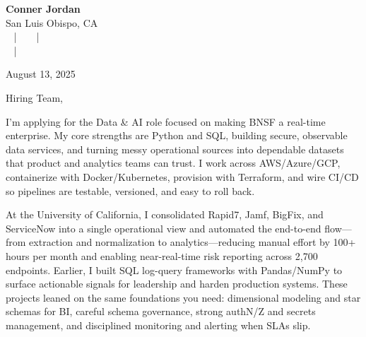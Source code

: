 \documentclass[letterpaper,11pt]{article}
\begin{document}
\begin{center}
  {\Huge \textbf{Conner Jordan}}\\[4pt]
  {\Large San Luis Obispo, CA}\\[4pt]
  \href{tel:+18059759793}{
    \raisebox{-0.05\height}{\faPhone\ (805) 975-9793}} ~ | ~
  \href{mailto:connercharlesjordan@gmail.com}{
    \raisebox{-0.15\height}{\faEnvelope\ connercharlesjordan@gmail.com}} ~ | ~
  \raisebox{-0.15\height}{\faMapMarker\ San Luis Obispo, CA} \\
  \href{https://www.linkedin.com/in/conner-jordan-4b268514a/}{
    \raisebox{-0.15\height}{\faLinkedin\ linkedin.com/in/conner-jordan-4b268514a}} ~ | ~
  \href{https://github.com/cjordan223}{
    \raisebox{-0.15\height}{\faGithub\ github.com/cjordan223}}
\end{center}

\vspace{16pt}

\begin{flushright}
August 13, 2025
\end{flushright}


\noindent
Hiring Team,

\vspace{16pt}

I’m applying for the Data \& AI role focused on making BNSF a real-time enterprise. My core strengths are Python and SQL, building secure, observable data services, and turning messy operational sources into dependable datasets that product and analytics teams can trust. I work across AWS/Azure/GCP, containerize with Docker/Kubernetes, provision with Terraform, and wire CI/CD so pipelines are testable, versioned, and easy to roll back.

\vspace{16pt}

At the University of California, I consolidated Rapid7, Jamf, BigFix, and ServiceNow into a single operational view and automated the end-to-end flow—from extraction and normalization to analytics—reducing manual effort by 100+ hours per month and enabling near-real-time risk reporting across 2,700 endpoints. Earlier, I built SQL log-query frameworks with Pandas/NumPy to surface actionable signals for leadership and harden production systems. These projects leaned on the same foundations you need: dimensional modeling and star schemas for BI, careful schema governance, strong authN/Z and secrets management, and disciplined monitoring and alerting when SLAs slip.
\end{document}
